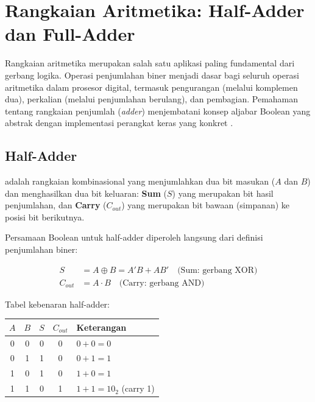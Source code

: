 \section{Rangkaian Aritmetika: Half-Adder dan Full-Adder}

Rangkaian aritmetika merupakan salah satu aplikasi paling fundamental dari gerbang logika. Operasi penjumlahan biner menjadi dasar bagi seluruh operasi aritmetika dalam prosesor digital, termasuk pengurangan (melalui komplemen dua), perkalian (melalui penjumlahan berulang), dan pembagian. Pemahaman tentang rangkaian penjumlah (\textit{adder}) menjembatani konsep aljabar Boolean yang abstrak dengan implementasi perangkat keras yang konkret \cite{rosen2019}.

\subsection{Half-Adder}

\begin{definisi}
 adalah rangkaian kombinasional yang menjumlahkan dua bit masukan ($A$ dan $B$) dan menghasilkan dua bit keluaran: \textbf{Sum} ($S$) yang merupakan bit hasil penjumlahan, dan \textbf{Carry} ($C_{out}$) yang merupakan bit bawaan (simpanan) ke posisi bit berikutnya.
\end{definisi}

Persamaan Boolean untuk half-adder diperoleh langsung dari definisi penjumlahan biner:

\begin{align*}
S &= A \oplus B = A'B + AB' \quad \text{(Sum: gerbang XOR)} \\
C_{out} &= A \cdot B \quad \text{(Carry: gerbang AND)}
\end{align*}

Tabel kebenaran half-adder:

\begin{center}
\renewcommand{\arraystretch}{1.2}
\begin{tabular}{|c|c||c|c|l|}
\hline
$A$ & $B$ & $S$ & $C_{out}$ & \textbf{Keterangan} \\ \hline
0 & 0 & 0 & 0 & $0 + 0 = 0$ \\ \hline
0 & 1 & 1 & 0 & $0 + 1 = 1$ \\ \hline
1 & 0 & 1 & 0 & $1 + 0 = 1$ \\ \hline
1 & 1 & 0 & 1 & $1 + 1 = 10_2$ (carry 1) \\ \hline
\end{tabular}
\end{center}

